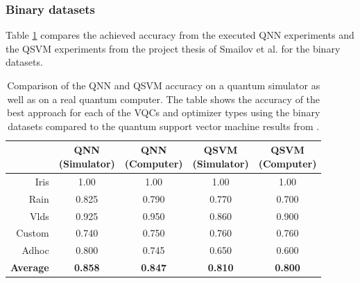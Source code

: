 \subsubsection{Binary datasets}
\label{subsubsection:binary_datasets_comparison}
Table \ref{table:comparison_binary_datasets_accuracy} compares the achieved accuracy from the executed QNN experiments and the QSVM experiments from the project thesis of Smailov et al.\cite{smailovQuantumMachineLearning2021} for the binary datasets.
\begin{table}[!h]
	\centering
	\begin{tabular}{r|cc|cc}
		\hline 
		\thead{Dataset} & \thead{QNN\\(Simulator)} & \thead{QNN\\(Computer)} & \thead{QSVM\\(Simulator)} & \thead{QSVM\\(Computer)} \\
		\hline 
		Iris    & 1.00     & 1.00    & 1.00    & 1.00   \\
		Rain    & 0.825    & 0.790   & 0.770   & 0.700  \\
		Vlds    & 0.925    & 0.950   & 0.860   & 0.900  \\
		Custom  & 0.740    & 0.750   & 0.760   & 0.760  \\
		Adhoc   & 0.800    & 0.745   & 0.650   & 0.600  \\
		\hline
		\textbf{Average}  & \textbf{0.858} & \textbf{0.847} & \textbf{0.810} & \textbf{0.800}  \\
		\hline
	\end{tabular}
	\caption{Comparison of the QNN and QSVM accuracy on a quantum simulator as well as on a real quantum computer. The table shows the accuracy of the best approach for each of the VQCs and optimizer types using the binary datasets compared to the quantum support vector machine results from \cite{smailovQuantumMachineLearning2021}.}
	\label{table:comparison_binary_datasets_accuracy}
\end{table}

